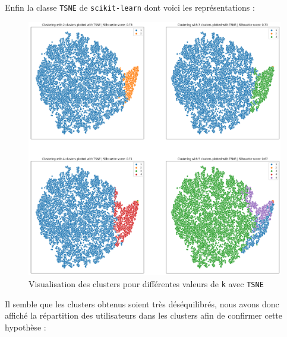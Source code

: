 \documentclass{article}
\begin{document}
Enfin la classe \texttt{TSNE} de \texttt{scikit-learn} dont voici les représentations :

\begin{figure}[ht]
  \centering
  \includegraphics[width=1\textwidth]{img/clustering_TSNE.png}
  \caption{Visualisation des clusters pour différentes valeurs de \texttt{k} avec \texttt{TSNE}}
\end{figure}
\newpage

Il semble que les clusters obtenus soient très déséquilibrés, nous avons donc
affiché la répartition des utilisateurs dans les clusters afin de confirmer
cette hypothèse :
\end{document}
